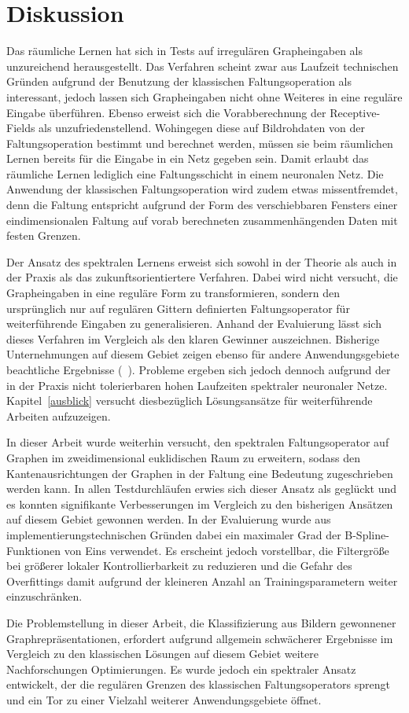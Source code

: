 \section{Diskussion}
\label{diskussion}

Das räumliche Lernen hat sich in Tests auf irregulären Grapheingaben als unzureichend herausgestellt.
Das Verfahren scheint zwar aus Laufzeit technischen Gründen aufgrund der Benutzung der klassischen Faltungsoperation als interessant, jedoch lassen sich Grapheingaben nicht ohne Weiteres in eine reguläre Eingabe überführen.
Ebenso erweist sich die Vorabberechnung der Receptive-Fields als unzufriedenstellend.
Wohingegen diese auf Bildrohdaten von der Faltungsoperation bestimmt und berechnet werden, müssen sie beim räumlichen Lernen bereits für die Eingabe in ein Netz gegeben sein.
Damit erlaubt das räumliche Lernen lediglich eine Faltungsschicht in einem neuronalen Netz.
Die Anwendung der klassischen Faltungsoperation wird zudem etwas missentfremdet, denn die Faltung entspricht aufgrund der Form des verschiebbaren Fensters einer eindimensionalen Faltung auf vorab berechneten zusammenhängenden Daten mit festen Grenzen.

Der Ansatz des spektralen Lernens erweist sich sowohl in der Theorie als auch in der Praxis als das zukunftsorientiertere Verfahren.
Dabei wird nicht versucht, die Grapheingaben in eine reguläre Form zu transformieren, sondern den ursprünglich nur auf regulären Gittern definierten Faltungsoperator für weiterführende Eingaben zu generalisieren.
Anhand der Evaluierung lässt sich dieses Verfahren im Vergleich als den klaren Gewinner auszeichnen.
Bisherige Unternehmungen auf diesem Gebiet zeigen ebenso für andere Anwendungsgebiete beachtliche Ergebnisse (\vgl{}~\cite{Defferrard, gcn}).
Probleme ergeben sich jedoch dennoch aufgrund der in der Praxis nicht tolerierbaren hohen Laufzeiten spektraler neuronaler Netze.
Kapitel~\ref{ausblick} versucht diesbezüglich Lösungsansätze für weiterführende Arbeiten aufzuzeigen.

In dieser Arbeit wurde weiterhin versucht, den spektralen Faltungsoperator auf Graphen im zweidimensional euklidischen Raum zu erweitern, sodass den Kantenausrichtungen der Graphen in der Faltung eine Bedeutung zugeschrieben werden kann.
In allen Testdurchläufen erwies sich dieser Ansatz als geglückt und es konnten signifikante Verbesserungen im Vergleich zu den bisherigen Ansätzen auf diesem Gebiet gewonnen werden.
In der Evaluierung wurde aus implementierungstechnischen Gründen dabei ein maximaler Grad der B-Spline-Funktionen von Eins verwendet.
Es erscheint jedoch vorstellbar, die Filtergröße bei größerer lokaler Kontrollierbarkeit zu reduzieren und die Gefahr des Overfittings damit aufgrund der kleineren Anzahl an Trainingsparametern weiter einzuschränken.

Die Problemstellung in dieser Arbeit, die Klassifizierung aus Bildern gewonnener Graphrepräsentationen, erfordert aufgrund allgemein schwächerer Ergebnisse im Vergleich zu den klassischen Lösungen auf diesem Gebiet weitere Nachforschungen \bzw{} Optimierungen.
Es wurde jedoch ein spektraler Ansatz entwickelt, der die regulären Grenzen des klassischen Faltungsoperators sprengt und ein Tor zu einer Vielzahl weiterer Anwendungsgebiete öffnet.
